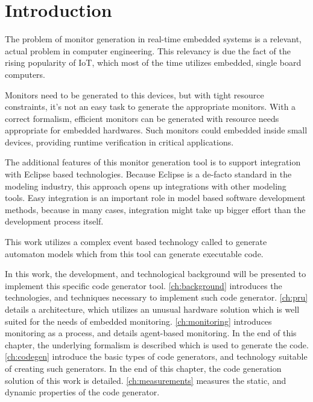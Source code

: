 
\chapter{Introduction}
\label{ch:introduction}

The problem of monitor generation in real-time embedded systems is a relevant, actual problem in computer engineering. This relevancy is due the fact of the rising popularity of IoT, which most of the time utilizes embedded, single board computers.

Monitors need to be generated to this devices, but with tight resource constraints, it's not an easy task to generate the appropriate monitors. With a correct formalism, efficient monitors can be generated with resource needs appropriate for embedded hardwares. Such monitors could embedded inside small devices, providing runtime verification in critical applications.

The additional features of this monitor generation tool is to support integration with Eclipse based technologies. Because Eclipse is a de-facto standard in the modeling industry, this approach opens up integrations with other modeling tools. Easy integration is an important role in model based software development methods, because in many cases, integration might take up bigger effort than the development process itself.

This work utilizes a complex event based technology called \viatrac{} to generate automaton models which from this tool can generate executable code.

In this work, the development, and technological background will be presented to implement this specific code generator tool. \cref{ch:background} introduces the technologies, and techniques necessary to implement such code generator. \cref{ch:pru} details a \cpu{} architecture, which utilizes an unusual hardware solution which is well suited for the needs of embedded monitoring. \cref{ch:monitoring} introduces monitoring as a process, and details agent-based monitoring. In the end of this chapter, the underlying formalism is described which is used to generate the code.
\cref{ch:codegen} introduce the basic types of code generators, and technology suitable of creating such generators. In the end of this chapter, the code generation solution of this work is detailed.
\cref{ch:measurements} measures the static, and dynamic properties of the code generator.
